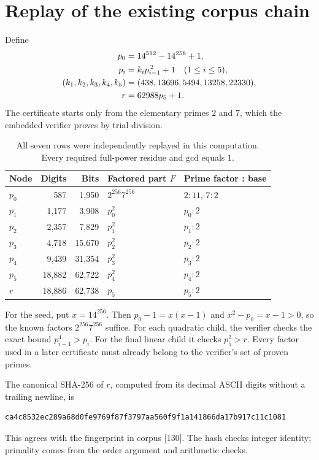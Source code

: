 \documentclass[11pt,a4paper]{article}
\theoremstyle{definition}\newtheorem{definition}[theorem]{Definition}
\theoremstyle{remark}\newtheorem{remark}[theorem]{Remark}
\begin{document}
\section{Replay of the existing corpus chain}\label{sec:chain}
Define
\begin{align}
 p_0&=14^{512}-14^{256}+1,\label{eq:seed}\\
 p_i&=k_i p_{i-1}^{\,2}+1\quad(1\leq i\leq5),\label{eq:chain}\\
 (k_1,k_2,k_3,k_4,k_5)&=(438,13696,5494,13258,22330),\notag\\
 r&=62988p_5+1.\label{eq:r}
\end{align}
The certificate starts only from the elementary primes $2$ and $7$,
which the embedded verifier proves by trial division.

\begin{table}[ht]
\centering\small
\begin{tabular}{@{}lrrll@{}}
\toprule
Node & Digits & Bits & Factored part $F$ & Prime factor : base\\
\midrule
$p_0$ & 587 & 1,950 & $2^{256}7^{256}$ & $2:11$, $7:2$\\
$p_1$ & 1,177 & 3,908 & $p_0^2$ & $p_0:2$\\
$p_2$ & 2,357 & 7,829 & $p_1^2$ & $p_1:2$\\
$p_3$ & 4,718 & 15,670 & $p_2^2$ & $p_2:2$\\
$p_4$ & 9,439 & 31,354 & $p_3^2$ & $p_3:2$\\
$p_5$ & 18,882 & 62,722 & $p_4^2$ & $p_4:2$\\
$r$ & 18,886 & 62,738 & $p_5$ & $p_5:2$\\
\bottomrule
\end{tabular}
\caption{All seven rows were independently replayed in this computation.
Every required full-power residue and gcd equals $1$.}
\label{tab:chain}
\end{table}

For the seed, put $x=14^{256}$. Then $p_0-1=x(x-1)$ and
$x^2-p_0=x-1>0$, so the known factors $2^{256}7^{256}$ suffice.
For each quadratic child, the verifier checks the exact bound
$p_{i-1}^4>p_i$. For the final linear child it checks $p_5^2>r$.
Every factor used in a later certificate must already belong to the
verifier's set of proven primes.

The canonical SHA-256 of $r$, computed from its decimal ASCII digits
without a trailing newline, is
\begin{lstlisting}[numbers=none]
ca4c8532ec289a68d0fe9769f87f3797aa560f9f1a141866da17b917c11c1081
\end{lstlisting}
This agrees with the fingerprint in corpus [130]. The hash checks integer
identity; primality comes from the order argument and arithmetic checks.
\end{document}
